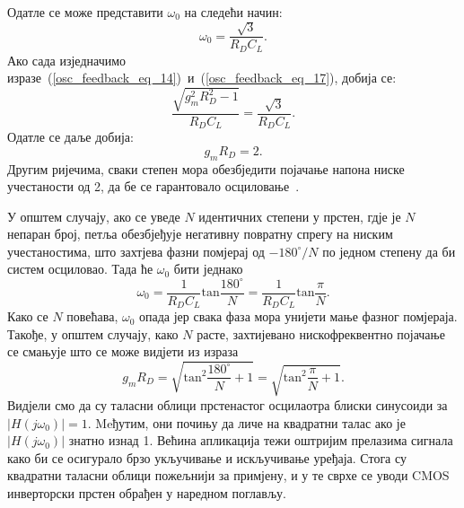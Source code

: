 \documentclass[master]{finthesis}
\begin{document}
Одатле се може представити $\omega_{0}$ на следећи начин:
\begin{equation}
	\label{osc_feedback_eq_17}
	\displaystyle
	\omega_{0} = \frac{\sqrt{3}}{R_{D}C_{L}}.
\end{equation}
Ако сада изједначимо изразе~(\ref{osc_feedback_eq_14})~и~(\ref{osc_feedback_eq_17}), добија се:
\begin{equation}
	\label{osc_feedback_eq_18}
	\displaystyle
	\frac{\sqrt{g_{m}^{2}R_{D}^{2}-1}}{R_{D}C_{L}} = \frac{\sqrt{3}}{R_{D}C_{L}}.
\end{equation}
Одатле се даље добија:
\begin{equation}
	\label{osc_feedback_eq_19}
	\displaystyle
	g_{m}R_{D} = 2.
\end{equation}
Другим ријечима, сваки степен мора обезбједити појачање напона ниске учестаности од 2, да бе се гарантовало осциловање~\cite{Razavi:PLL_CMOS_2020}. \par
У општем случају, ако се уведе $N$ идентичних степени у прстен, гдје је $N$ непаран број, петља обезбјеђује негативну повратну спрегу на ниским учестаностима, што захтјева фазни помјерај од $-180^{\circ}/N$ по једном степену да би систем осциловао. Тада ће $\omega_{0}$ бити једнако
\begin{equation}
	\label{osc_feedback_eq_20}
	\displaystyle
	\omega_{0} = \frac{1}{R_{D}C_{L}}\text{tan}\frac{180^{\circ}}{N} = \frac{1}{R_{D}C_{L}}\text{tan}\frac{\pi}{N}.
\end{equation}
Како се $N$ повећава, $\omega_{0}$ опада јер свака фаза мора унијети мање фазног помјераја. Такође, у општем случају, како $N$ расте, захтијевано нискофреквентно појачање се смањује што се може видјети из израза
\begin{equation}
	\label{osc_feedback_eq_21}
	\displaystyle
	g_{m}R_{D} = \sqrt{\text{tan}^{2}\frac{180^{\circ}}{N}+1} = \sqrt{\text{tan}^{2}\frac{\pi}{N}+1}.
\end{equation}
Видјели смо да су таласни облици прстенастог осцилаотра блиски синусоиди за $|H(j\omega_{0})|=1$. Meђутим, они почињу да личе на квадратни талас ако је $|H(j\omega_{0})|$ знатно изнад 1. Већина апликација тежи оштријим прелазима сигнала како би се осигурало брзо укључивање и искључивање уређаја. Стога су квадратни таласни облици пожељнији за примјену, и у те сврхе се уводи CMOS инверторски прстен обрађен у наредном поглављу.
\end{document}
